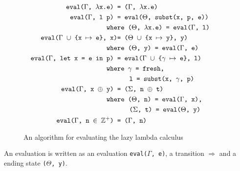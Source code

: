 \begin{figure}[p]
	\begin{mdframed}[style=style1]
		\begin{align}
			\texttt{eval($\Gamma$, $\lambda$x.e) }              & \texttt{= ($\Gamma$, $\lambda$x.e)}\tag*{}                          \\
			\texttt{eval($\Gamma$, l p) }                       & \texttt{= eval($\Theta$, subst(x, p, e))}\tag*{}                    \\
			\texttt{whe}&\texttt{re ($\Theta$, $\lambda$x.e) = eval($\Gamma$, l)}\tag*{}                                                           \\
			\texttt{eval($\Gamma$ $\cup$ \{x $\mapsto$ e\}, x)} & \texttt{= ($\Theta$ $\cup$ \{x $\mapsto$ y\}, y)}\tag*{}            \\
			\texttt{whe}&\texttt{re ($\Theta$, y) = eval($\Gamma$, e)}\tag*{}                                                                      \\
			\texttt{eval($\Gamma$, let x = e in p) }            & \texttt{= eval($\Gamma$ $\cup$ \{$\gamma$ $\mapsto$ e\}, l)}\tag*{} \\
			\texttt{whe}&\texttt{re $\gamma$ = fresh,}\tag*{}                                                                                      \\
			&\hspace{0.62cm}\texttt{l = subst(x, $\gamma$, p)}\tag*{}                                                                              \\
			\texttt{eval($\Gamma$, x $\oplus$ y) }              & \texttt{= ($\Sigma$, n $\oplus$ t)}\tag*{}                          \\
			\texttt{whe}&\texttt{re ($\Theta$, n) = eval($\Gamma$, x),}\tag*{}                                                                     \\
			&\hspace{0.62cm}\texttt{($\Sigma$, t) = eval($\Theta$, y)}\tag*{}                                                                      \\
			\texttt{eval($\Gamma$, n $\in$ $\mathbb{Z^+}$) }    & \texttt{= ($\Gamma$, n)}\tag*{}
		\end{align}
	\end{mdframed}
	\caption{An algorithm for evaluating the lazy lambda calculus}
	\label{fig:eval:laznaive}
\end{figure}
An evaluation is written as an evaluation \texttt{eval($\Gamma$, e)}, a transition $\Rightarrow$ and a ending state \texttt{($\Theta$, y)}.
